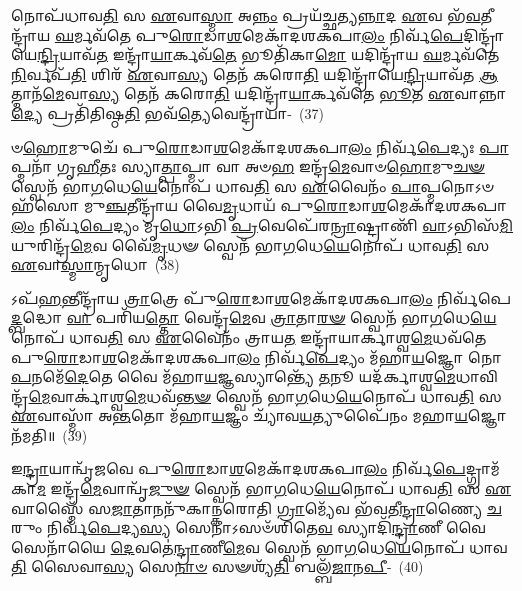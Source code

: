𑌨𑍋𑌪᳴𑌧𑌾𑌵\-\ul{𑌤𑌿} 𑌸 \ul{𑌏}\-𑌵𑌾\-\ul{𑌸𑍍𑌮𑌾} 𑌅\-\ul{𑌨𑍍𑌨𑌂} 𑌪𑍍𑌰𑌯᳴𑌚𑍍𑌛𑌤𑍍𑌯\-\ul{𑌨𑍍𑌨𑌾}\-𑌦 \ul{𑌏}\-𑌵 𑌭᳴\-\ul{𑌵}\-𑌤𑍀𑌨𑍍𑌦𑍍𑌰𑌾᳴𑌯 \ul{𑌘}\-𑌰𑍍𑌮𑌵᳴𑌤𑍇 𑌪𑍁\-\ul{𑌰𑍋}\-𑌡𑌾\-\ul{𑌶}\-𑌮𑍇𑌕𑌾᳴\-𑌦𑌶\-𑌕𑌪𑌾\-\ul{𑌲𑌂} 𑌨𑌿𑌰𑍍𑌵᳴\-\ul{𑌪𑍇}\-𑌦𑌿𑌨𑍍𑌦𑍍𑌰𑌾᳴𑌯𑍇\-\ul{𑌨𑍍𑌦𑍍𑌰𑌿}\-𑌯𑌾𑌵᳴\-\ul{𑌤} 𑌇𑌨𑍍𑌦𑍍𑌰𑌾᳴\-\ul{𑌯𑌾}\-𑌰𑍍𑌕𑌵᳴\-\ul{𑌤𑍇} 𑌭𑍂𑌤𑌿᳴𑌕𑌾\-\ul{𑌮𑍋} 𑌯𑌦𑌿𑌨𑍍𑌦𑍍𑌰𑌾᳴𑌯 \ul{𑌘}\-𑌰𑍍𑌮𑌵᳴𑌤𑍇 \ul{𑌨𑌿}\-𑌰𑍍𑌵𑌪᳴\-\ul{𑌤𑌿} 𑌶𑌿𑌰᳴ \ul{𑌏}\-𑌵𑌾\-\ul{𑌸𑍍𑌯} 𑌤𑍇𑌨᳴ 𑌕𑌰𑍋\-\ul{𑌤𑌿} 𑌯𑌦𑌿𑌨𑍍𑌦𑍍𑌰𑌾᳴𑌯𑍇\-\ul{𑌨𑍍𑌦𑍍𑌰𑌿}\-𑌯𑌾𑌵᳴𑌤 \ul{𑌆}\-𑌤𑍍𑌮𑌾𑌨᳴\-\ul{𑌮𑍇}\-𑌵𑌾\-\ul{𑌸𑍍𑌯} 𑌤𑍇𑌨᳴ 𑌕𑌰𑍋\-\ul{𑌤𑌿} 𑌯𑌦𑌿𑌨𑍍𑌦𑍍𑌰𑌾᳴\-\ul{𑌯𑌾}\-𑌰𑍍𑌕𑌵᳴𑌤𑍇 \ul{𑌭𑍂}\-𑌤 \ul{𑌏}\-𑌵𑌾𑌨𑍍𑌨𑌾\-\ul{𑌦𑍍𑌯𑍇} 𑌪𑍍𑌰𑌤𑌿᳴𑌤𑌿𑌷𑍍𑌠\-\ul{𑌤𑌿} 𑌭𑌵᳴\-\ul{𑌤𑍍𑌯𑍇}\-𑌵𑍇𑌨𑍍𑌦𑍍𑌰𑌾᳴𑌯𑌾-~(37)

𑍞\-\ul{𑌹𑍋}\-𑌮𑍁𑌚𑍇᳴ 𑌪𑍁\-\ul{𑌰𑍋}\-𑌡𑌾\-\ul{𑌶}\-𑌮𑍇𑌕𑌾᳴\-𑌦𑌶\-𑌕𑌪𑌾\-\ul{𑌲𑌂} 𑌨𑌿𑌰𑍍𑌵᳴\-\ul{𑌪𑍇}\-𑌦𑍍𑌯𑌃 \ul{𑌪𑌾}\-𑌪𑍍𑌮𑌨𑌾᳴ 𑌗𑍃\-\ul{𑌹𑍀}\-𑌤𑌃 𑌸𑍍𑌯𑌾\-\ul{𑌤𑍍𑌪𑌾}\-𑌪𑍍𑌮𑌾 𑌵𑌾 𑌅𑍞\-\ul{𑌹} 𑌇𑌨𑍍𑌦𑍍𑌰᳴\-\ul{𑌮𑍇}\-𑌵𑌾𑍞\-\ul{𑌹𑍋}\-𑌮𑍁\-\ul{𑌚}\-\-\ul{𑍟} 𑌸𑍍𑌵𑍇𑌨᳴ 𑌭𑌾\-\ul{𑌗}\-𑌧𑍇\-\ul{𑌯𑍇}\-𑌨𑍋𑌪᳴ 𑌧𑌾𑌵\-\ul{𑌤𑌿} 𑌸 \ul{𑌏}\-𑌵𑍈𑌨𑌂᳴ \ul{𑌪𑌾}\-𑌪𑍍𑌮𑌨𑍋\-𑌽𑍞𑌹᳴𑌸𑍋 𑌮𑍁\-\ul{𑌞𑍍𑌚}\-𑌤𑍀𑌨𑍍𑌦𑍍𑌰𑌾᳴𑌯 𑌵𑍈\-\ul{𑌮𑍃}\-𑌧𑌾𑌯᳴ 𑌪𑍁\-\ul{𑌰𑍋}\-𑌡𑌾\-\ul{𑌶}\-𑌮𑍇𑌕𑌾᳴\-𑌦𑌶\-𑌕𑌪𑌾\-\ul{𑌲𑌂} 𑌨𑌿𑌰𑍍𑌵᳴\-\ul{𑌪𑍇}\-𑌦𑍍𑌯𑌂 𑌮𑍃\-\ul{𑌧𑍋}\-\-𑌽𑌭𑌿 \ul{𑌪𑍍𑌰}\-𑌵𑍇𑌪𑍇᳴𑌰\-\ul{𑌨𑍍𑌰𑌾}\-𑌷𑍍𑌟𑍍𑌰𑌾𑌣𑌿᳴ \ul{𑌵𑌾}\-\-𑌽𑌭𑌿𑌸᳴\-\ul{𑌮𑌿}\-𑌯𑍁𑌰𑌿𑌨𑍍𑌦𑍍𑌰᳴\-\ul{𑌮𑍇}\-𑌵 𑌵𑍈᳴\-\ul{𑌮𑍃}\-𑌧𑍟 𑌸𑍍𑌵𑍇𑌨᳴ 𑌭𑌾\-\ul{𑌗}\-𑌧𑍇\-\ul{𑌯𑍇}\-𑌨𑍋𑌪᳴ 𑌧𑌾𑌵\-\ul{𑌤𑌿} 𑌸 \ul{𑌏}\-𑌵𑌾\-\ul{𑌸𑍍𑌮𑌾}\-𑌨𑍍𑌮𑍃𑌧𑍋~(38)

𑌽𑌪᳴\-\ul{𑌹}\-𑌨𑍍𑌤𑍀𑌨𑍍𑌦𑍍𑌰𑌾᳴𑌯 \ul{𑌤𑍍𑌰𑌾}\-𑌤𑍍𑌰𑍇 𑌪𑍁᳴\-\ul{𑌰𑍋}\-𑌡𑌾\-\ul{𑌶}\-𑌮𑍇𑌕𑌾᳴\-𑌦𑌶\-𑌕𑌪𑌾\-\ul{𑌲𑌂} 𑌨𑌿𑌰𑍍𑌵᳴𑌪𑍇\-\ul{𑌦𑍍𑌬}\-𑌦𑍍𑌧𑍋 \ul{𑌵𑌾} 𑌪𑌰𑌿᳴𑌯\-\ul{𑌤𑍍𑌤𑍋} 𑌵𑍇𑌨𑍍𑌦𑍍𑌰᳴\-\ul{𑌮𑍇}\-𑌵 \ul{𑌤𑍍𑌰𑌾}\-𑌤𑌾\-\ul{𑌰}\-\-\ul{𑍟} 𑌸𑍍𑌵𑍇𑌨᳴ 𑌭𑌾\-\ul{𑌗}\-𑌧𑍇\-\ul{𑌯𑍇}\-𑌨𑍋𑌪᳴ 𑌧𑌾𑌵\-\ul{𑌤𑌿} 𑌸 \ul{𑌏}\-𑌵𑍈𑌨𑌂᳴ 𑌤𑍍𑌰𑌾𑌯\-\ul{𑌤} 𑌇𑌨𑍍𑌦𑍍𑌰𑌾᳴𑌯𑌾𑌰𑍍𑌕𑌾𑌶𑍍𑌵\-\ul{𑌮𑍇}\-𑌧𑌵᳴𑌤𑍇 𑌪𑍁\-\ul{𑌰𑍋}\-𑌡𑌾\-\ul{𑌶}\-𑌮𑍇𑌕𑌾᳴\-𑌦𑌶\-𑌕𑌪𑌾\-\ul{𑌲𑌂} 𑌨𑌿𑌰𑍍𑌵᳴\-\ul{𑌪𑍇}\-𑌦𑍍𑌯𑌂 𑌮᳴𑌹𑌾\-\ul{𑌯}\-𑌜𑍍𑌞𑍋 𑌨𑍋\-\ul{𑌪}\-𑌨𑌮𑍇᳴\-\ul{𑌦𑍇}\-𑌤𑍇 𑌵𑍈 𑌮᳴𑌹𑌾\-\ul{𑌯}\-𑌜𑍍𑌞𑌸𑍍𑌯𑌾𑌨𑍍𑌤𑍍𑌯𑍇᳴ \ul{𑌤}\-𑌨𑍂 𑌯𑌦᳴𑌰𑍍𑌕𑌾𑌶𑍍𑌵\-\ul{𑌮𑍇}\-𑌧𑌾𑌵𑌿𑌨𑍍𑌦𑍍𑌰᳴\-\ul{𑌮𑍇}\-𑌵𑌾𑌰𑍍𑌕𑌾॑𑌶𑍍𑌵\-\ul{𑌮𑍇}\-𑌧𑌵᳴\-\ul{𑌨𑍍𑌤}\-\-\ul{𑍟} 𑌸𑍍𑌵𑍇𑌨᳴ 𑌭𑌾\-\ul{𑌗}\-𑌧𑍇\-\ul{𑌯𑍇}\-𑌨𑍋𑌪᳴ 𑌧𑌾𑌵\-\ul{𑌤𑌿} 𑌸 \ul{𑌏}\-𑌵𑌾𑌸𑍍𑌮𑌾᳴ 𑌅\-\ul{𑌨𑍍𑌤}\-𑌤𑍋 𑌮᳴𑌹𑌾\-\ul{𑌯}\-𑌜𑍍𑌞𑌂 𑌚𑍍𑌯𑌾᳴𑌵\-\ul{𑌯}\-𑌤𑍍𑌯𑍁𑌪𑍈᳴𑌨𑌂 𑌮𑌹𑌾\-\ul{𑌯}\-𑌜𑍍𑌞𑍋 𑌨᳴𑌮𑌤𑌿॥~(39)

{\anuvakamend[{\-\ul{𑌇}\-\-\ul{𑌨𑍍𑌦𑍍𑌰𑌿}\-𑌯𑌾𑌵᳴\-\ul{𑌨𑍍𑌤}\-\-\ul{𑍟} 𑌸𑍍𑌵𑍇𑌨᳴ 𑌭𑌾\-\ul{𑌗}\-𑌧𑍇\-\ul{𑌯𑍇}\-𑌨𑍋𑌪᳴ 𑌧𑌾𑌵\-\ul{𑌤𑌿} 𑌸𑍋॑\-𑌽𑌰𑍍𑌕𑌵᳴\-\ul{𑌨𑍍𑌤}\-\-\ul{𑍟} 𑌸𑍍𑌵𑍇𑌨᳴ 𑌭𑌾\-\ul{𑌗}\-𑌧𑍇𑌯𑍇᳴\-\ul{𑌨𑍈}\-𑌵𑍇𑌨𑍍𑌦𑍍𑌰𑌾᳴𑌯𑌾\-\ul{𑌸𑍍𑌮𑌾}\-𑌨𑍍𑌮𑍃𑌧𑍋॑\-𑌽𑌸𑍍𑌮𑍈 \ul{𑌸}\-𑌪𑍍𑌤 𑌚᳴}]}

𑌇\-\ul{𑌨𑍍𑌦𑍍𑌰𑌾}\-𑌯𑌾𑌨𑍍𑌵𑍃᳴𑌜𑌵𑍇 𑌪𑍁\-\ul{𑌰𑍋}\-𑌡𑌾\-\ul{𑌶}\-𑌮𑍇𑌕𑌾᳴\-𑌦𑌶\-𑌕𑌪𑌾\-\ul{𑌲𑌂} 𑌨𑌿𑌰𑍍𑌵᳴\-\ul{𑌪𑍇}\-𑌦𑍍𑌗𑍍𑌰𑌾𑌮᳴𑌕𑌾\-\ul{𑌮} 𑌇𑌨𑍍𑌦𑍍𑌰᳴\-\ul{𑌮𑍇}\-𑌵𑌾𑌨𑍍𑌵𑍃᳴\-\ul{𑌜𑍁}\-\-\ul{𑍟} 𑌸𑍍𑌵𑍇𑌨᳴ 𑌭𑌾\-\ul{𑌗}\-𑌧𑍇\-\ul{𑌯𑍇}\-𑌨𑍋𑌪᳴ 𑌧𑌾𑌵\-\ul{𑌤𑌿} 𑌸 \ul{𑌏}\-𑌵𑌾𑌸𑍍𑌮𑍈᳴ 𑌸\-\ul{𑌜𑌾}\-𑌤𑌾𑌨𑌨𑍁᳴𑌕𑌾𑌨𑍍𑌕𑌰𑍋𑌤𑌿 \ul{𑌗𑍍𑌰𑌾}\-𑌮𑍍𑌯𑍇᳴𑌵 𑌭᳴𑌵𑌤𑍀\-\ul{𑌨𑍍𑌦𑍍𑌰𑌾}\-𑌣𑍍𑌯𑍈 \ul{𑌚}\-𑌰𑍁𑌂 𑌨𑌿𑌰𑍍𑌵᳴\-\ul{𑌪𑍇}\-𑌦𑍍𑌯\-\ul{𑌸𑍍𑌯} 𑌸𑍇𑌨𑌾\-𑌽𑌸𑍞᳴𑌶𑌿𑌤𑍇\-\ul{𑌵} 𑌸𑍍𑌯𑌾𑌦𑌿᳴\-\ul{𑌨𑍍𑌦𑍍𑌰𑌾}\-𑌣𑍀 𑌵𑍈 𑌸𑍇𑌨𑌾᳴𑌯𑍈 \ul{𑌦𑍇}\-𑌵𑌤𑍇॑\-\ul{𑌨𑍍𑌦𑍍𑌰𑌾}\-𑌣𑍀\-\ul{𑌮𑍇}\-𑌵 𑌸𑍍𑌵𑍇𑌨᳴ 𑌭𑌾\-\ul{𑌗}\-𑌧𑍇\-\ul{𑌯𑍇}\-𑌨𑍋𑌪᳴ 𑌧𑌾𑌵\-\ul{𑌤𑌿} 𑌸𑍈𑌵𑌾\-\ul{𑌸𑍍𑌯} 𑌸𑍇\-\ul{𑌨𑌾}\-\-\ul{𑍞} 𑌸𑍟𑌶𑍍𑌯᳴\-\ul{𑌤𑌿} 𑌬𑌲𑍍𑌬᳴\-\ul{𑌜𑌾}\-𑌨\-\ul{𑌪𑍀}\--~(40)

